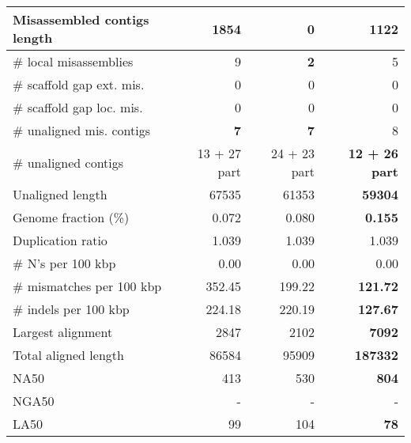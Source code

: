 \documentclass[12pt,a4paper]{article}
\begin{document}
\begin{table}[ht]
\begin{center}
\begin{tabular}{|l*{3}{|r}|}
Misassembled contigs length & 1854 & {\bf 0} & 1122 \\ \hline
\# local misassemblies & 9 & {\bf 2} & 5 \\ \hline
\# scaffold gap ext. mis. & 0 & 0 & 0 \\ \hline
\# scaffold gap loc. mis. & 0 & 0 & 0 \\ \hline
\# unaligned mis. contigs & {\bf 7} & {\bf 7} & 8 \\ \hline
\# unaligned contigs & 13 + 27 part & 24 + 23 part & {\bf 12 + 26 part} \\ \hline
Unaligned length & 67535 & 61353 & {\bf 59304} \\ \hline
Genome fraction (\%) & 0.072 & 0.080 & {\bf 0.155} \\ \hline
Duplication ratio & 1.039 & 1.039 & 1.039 \\ \hline
\# N's per 100 kbp & 0.00 & 0.00 & 0.00 \\ \hline
\# mismatches per 100 kbp & 352.45 & 199.22 & {\bf 121.72} \\ \hline
\# indels per 100 kbp & 224.18 & 220.19 & {\bf 127.67} \\ \hline
Largest alignment & 2847 & 2102 & {\bf 7092} \\ \hline
Total aligned length & 86584 & 95909 & {\bf 187332} \\ \hline
NA50 & 413 & 530 & {\bf 804} \\ \hline
NGA50 & - & - & - \\ \hline
LA50 & 99 & 104 & {\bf 78} \\ \hline
\end{tabular}
\end{center}
\end{table}
\end{document}
